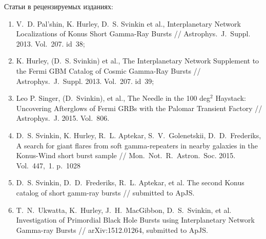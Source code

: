 Статьи в рецензируемых изданиях:
\begin{enumerate}
\item V.~D. Pal'shin, K. Hurley, D.~S. Svinkin et al., Interplanetary Network Localizations of
Konus Short Gamma-Ray Bursts // Astrophys.~J.~Suppl. 2013. Vol.~207. id~38;
\item K. Hurley, (D.~S. Svinkin) et al., The Interplanetary Network Supplement to 
the Fermi GBM Catalog of Cosmic Gamma-Ray Bursts // Astrophys.~J.~Suppl. 2013. Vol.~207. id~39;
\item Leo P. Singer, (D.~Svinkin), et al., The Needle in the 100 deg$^2$ Haystack: 
Uncovering Afterglows of Fermi GRBs with the Palomar Transient Factory // 
Astrophys.~J. 2015. Vol.~806.
\item D.~S. Svinkin, K. Hurley, R.~L. Aptekar, S.~V.~Golenetskii, D.~D.~Frederiks, 
A search for giant flares from soft gamma-repeaters in nearby galaxies in the 
Konus-Wind short burst sample // Mon.~Not.~R.~Astron.~Soc. 2015. Vol.~447,~1. p.~1028
\item D.~S. Svinkin, D.~D.~Frederiks, R.~L. Aptekar, et al.
The second Konus catalog of short gamm-ray bursts // submitted to ApJS.
\item T.~N.~Ukwatta, K.~Hurley, J.~H.~MacGibbon, D.~S.~Svinkin, et al.
Investigation of Primordial Black Hole Bursts using Interplanetary Network Gamma-ray Bursts // 
arXiv:1512.01264, submitted to ApJS.

\end{enumerate}

